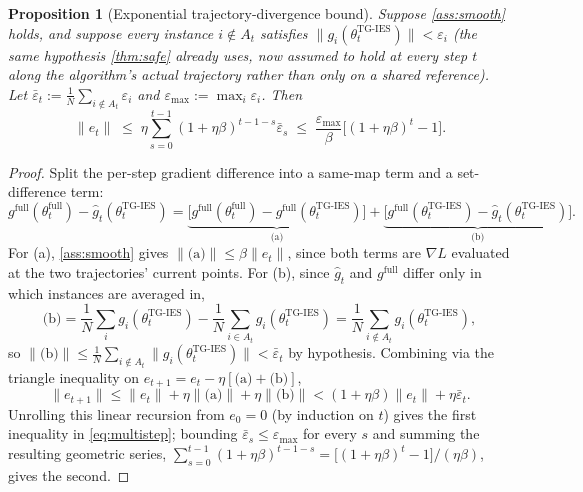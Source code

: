 \documentclass{article}
\theoremstyle{plain}
\newtheorem{proposition}[theorem]{Proposition}
\theoremstyle{definition}
\theoremstyle{remark}
\begin{document}
\begin{proposition}[Exponential trajectory-divergence bound]
\label{prop:multistep}
Suppose \cref{ass:smooth} holds, and suppose every instance $i\notin A_t$ satisfies $\|g_i(\theta_t^{\mathrm{TG\text{-}IES}})\| < \varepsilon_i$ (the same hypothesis \cref{thm:safe} already uses, now assumed to hold at every step $t$ along the algorithm's actual trajectory rather than only on a shared reference). Let $\bar\varepsilon_t := \frac1N\sum_{i\notin A_t}\varepsilon_i$ and $\varepsilon_{\max} := \max_i \varepsilon_i$. Then
\begin{equation}
\label{eq:multistep}
\|e_t\| \;\le\; \eta\sum_{s=0}^{t-1}(1+\eta\beta)^{t-1-s}\bar\varepsilon_s \;\le\; \frac{\varepsilon_{\max}}{\beta}\Big[(1+\eta\beta)^t - 1\Big].
\end{equation}
\end{proposition}
\begin{proof}
Split the per-step gradient difference into a same-map term and a set-difference term:
\[
g^{\mathrm{full}}(\theta_t^{\mathrm{full}}) - \hat g_t(\theta_t^{\mathrm{TG\text{-}IES}})
= \underbrace{\big[g^{\mathrm{full}}(\theta_t^{\mathrm{full}}) - g^{\mathrm{full}}(\theta_t^{\mathrm{TG\text{-}IES}})\big]}_{\text{(a)}}
+ \underbrace{\big[g^{\mathrm{full}}(\theta_t^{\mathrm{TG\text{-}IES}}) - \hat g_t(\theta_t^{\mathrm{TG\text{-}IES}})\big]}_{\text{(b)}}.
\]
For (a), \cref{ass:smooth} gives $\|\text{(a)}\| \le \beta\|e_t\|$, since both terms are $\nabla L$ evaluated at the two trajectories' current points. For (b), since $\hat g_t$ and $g^{\mathrm{full}}$ differ only in which instances are averaged in,
\[
\text{(b)} = \frac1N\sum_i g_i(\theta_t^{\mathrm{TG\text{-}IES}}) - \frac1N\sum_{i\in A_t}g_i(\theta_t^{\mathrm{TG\text{-}IES}}) = \frac1N\sum_{i\notin A_t}g_i(\theta_t^{\mathrm{TG\text{-}IES}}),
\]
so $\|\text{(b)}\| \le \frac1N\sum_{i\notin A_t}\|g_i(\theta_t^{\mathrm{TG\text{-}IES}})\| < \bar\varepsilon_t$ by hypothesis. Combining via the triangle inequality on $e_{t+1} = e_t - \eta[\text{(a)}+\text{(b)}]$,
\[
\|e_{t+1}\| \le \|e_t\| + \eta\|\text{(a)}\| + \eta\|\text{(b)}\| < (1+\eta\beta)\|e_t\| + \eta\bar\varepsilon_t.
\]
Unrolling this linear recursion from $e_0=0$ (by induction on $t$) gives the first inequality in \cref{eq:multistep}; bounding $\bar\varepsilon_s \le \varepsilon_{\max}$ for every $s$ and summing the resulting geometric series, $\sum_{s=0}^{t-1}(1+\eta\beta)^{t-1-s} = \big[(1+\eta\beta)^t-1\big]/(\eta\beta)$, gives the second.
\end{proof}
\end{document}
